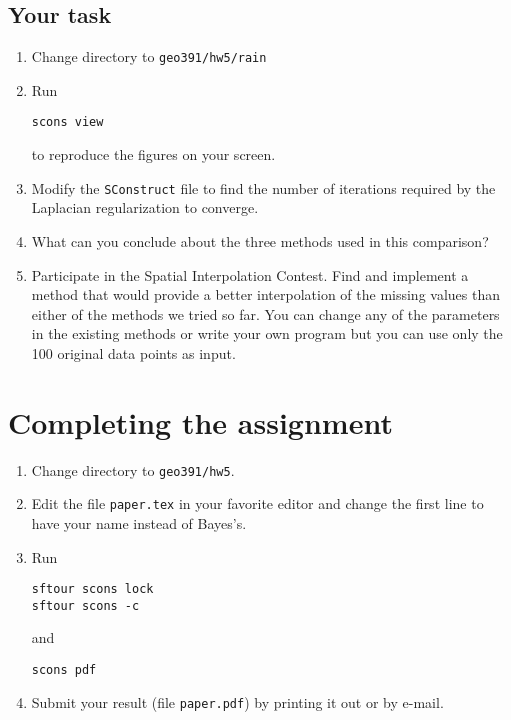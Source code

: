 
\subsection{Your task}

\begin{enumerate}
\item Change directory to \verb#geo391/hw5/rain#
\item Run 
\begin{verbatim}
scons view
\end{verbatim}
to reproduce the figures on your screen.
\item Modify the \texttt{SConstruct} file to find the number of iterations required by the Laplacian regularization to converge.
\item What can you conclude about the three methods used in this comparison?
\item Participate in the Spatial Interpolation Contest. Find and
implement a method that would provide a better interpolation of the
missing values than either of the methods we tried so far. You can change any of the parameters in the existing methods or 
write your own program but you can use only the 100 original data points as input.
\end{enumerate}

\lstset{language=python,numbers=left,numberstyle=\tiny,showstringspaces=false}


\newpage

\section{Completing the assignment}

\begin{enumerate}
\item Change directory to \verb#geo391/hw5#.
\item Edit the file \texttt{paper.tex} in your favorite editor and change the
  first line to have your name instead of Bayes's.
\item Run
\begin{verbatim}
sftour scons lock
sftour scons -c
\end{verbatim}
and
\begin{verbatim}
scons pdf
\end{verbatim}
\item Submit your result (file \texttt{paper.pdf}) by printing it out
  or by e-mail.
\end{enumerate}



